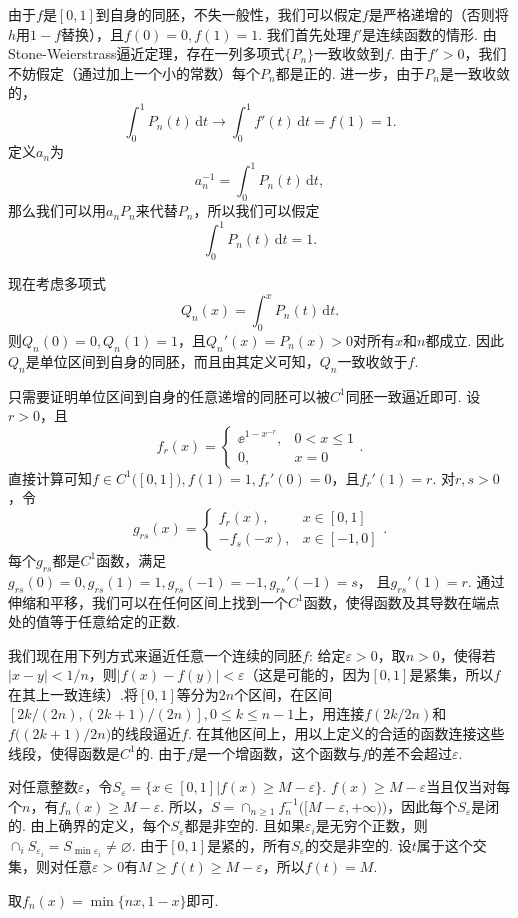 \begin{ans}
  由于$f$是$[0,1]$到自身的同胚，不失一般性，我们可以假定$f$是严格递增的（否则将$h$用$1-f$替换），且$f(0)=0,f(1)=1$. 我们首先处理$f'$是连续函数的情形. 由Stone-Weierstrass逼近定理，存在一列多项式$\{P_n\}$一致收敛到$f$. 由于$f'>0$，我们不妨假定（通过加上一个小的常数）每个$P_n$都是正的. 进一步，由于$P_n$是一致收敛的，
  \[
    \int_0^1P_n(t)\,\mathrm dt\to\int_0^1f'(t)\,\mathrm dt=f(1)=1.
  \]
  定义$a_n$为
  \[ a_n^{-1} = \int_0^1P_n(t)\,\mathrm dt, \]
  那么我们可以用$a_nP_n$来代替$P_n$，所以我们可以假定
  \[ \int_0^1P_n(t)\,\mathrm dt = 1. \]

  现在考虑多项式
  \[ Q_n(x) = \int_0^xP_n(t)\,\mathrm dt. \]
  则$Q_n(0)=0,Q_n(1)=1$，且$Q_n'(x)=P_n(x)>0$对所有$x$和$n$都成立. 因此$Q_n$是单位区间到自身的同胚，而且由其定义可知，$Q_n$一致收敛于$f$.

  只需要证明单位区间到自身的任意递增的同胚可以被$C^1$同胚一致逼近即可. 设$r>0$，且
  \[
    f_r(x) = \begin{cases}
      \ee^{1-x^{-r}}, & 0<x\le1\\
      0, & x=0
    \end{cases}.
  \]
  直接计算可知$f\in C^1\big([0,1]\big),f(1)=1,f_r'(0)=0$，且$f_r'(1)=r$. 对$r,s>0$，令
  \[
    g_{rs}(x) = \begin{cases}
      f_r(x) , & x \in [0,1]\\
      -f_s(-x), & x \in [-1,0]
    \end{cases}.
  \]
  每个$g_{rs}$都是$C^1$函数，满足$g_{rs}(0)=0,g_{rs}(1)=1,g_{rs}(-1)=-1,g_{rs}'(-1)=s$，
  且$g_{rs}'(1)=r$. 通过伸缩和平移，我们可以在任何区间上找到一个$C^1$函数，使得函数及其导数在端点处的值等于任意给定的正数.

  我们现在用下列方式来逼近任意一个连续的同胚$f$: 给定$\varepsilon>0$，取$n>0$，使得若$|x-y|<1/n$，则$|f(x)-f(y)|<\varepsilon$（这是可能的，因为$[0,1]$是紧集，所以$f$在其上一致连续）.将$[0,1]$等分为$2n$个区间，在区间$[2k/(2n),(2k+1)/(2n)],0\le k\le n-1$上，用连接$f(2k/2n)$和$f\big((2k+1)/2n)$的线段逼近$f$. 在其他区间上，用以上定义的合适的函数连接这些线段，使得函数是$C^1$的. 由于$f$是一个增函数，这个函数与$f$的差不会超过$\varepsilon$.
\end{ans}

\begin{ans}
  \begin{enumb}
    \item 对任意整数$\varepsilon$，令$S_\varepsilon=\{x\in[0,1]|f(x)\ge M-\varepsilon\}$. $f(x)\ge M-\varepsilon$当且仅当对每个$n$，有$f_n(x)\ge M-\varepsilon$. 所以，$S=\cap_{n\ge1}f_n^{-1}\big([M-\varepsilon,+\infty)\big)$，因此每个$S_\varepsilon$是闭的. 由上确界的定义，每个$S_\varepsilon$都是非空的. 且如果$\varepsilon_i$是无穷个正数，则$\cap_iS_{\varepsilon_i}=S_{\min\varepsilon_i}\ne\varnothing$. 由于$[0,1]$是紧的，所有$S_\varepsilon$的交是非空的. 设$t$属于这个交集，则对任意$\varepsilon>0$有$M\ge f(t)\ge M-\varepsilon$，所以$f(t)=M$.
    \item 取$f_n(x)=\min\{nx,1-x\}$即可.
  \end{enumb}
\end{ans}

